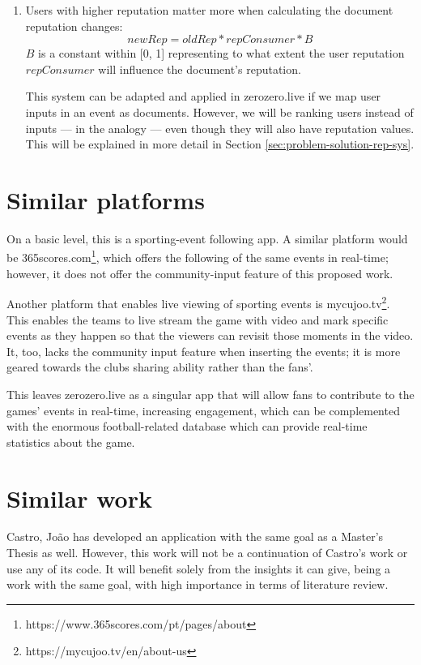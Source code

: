 \begin{enumerate}
    \item Users with higher reputation matter more when calculating the document reputation changes:
    \begin{equation}
        newRep = oldRep * repConsumer * B
    \end{equation}
    $B$ is a constant within [0, 1] representing to what extent the user reputation $repConsumer$ will influence the document's reputation.

    This system can be adapted and applied in zerozero.live if we map user inputs in an event as documents. However, we will be ranking users instead of inputs ---  in the analogy --- even though they will also have reputation values. This will be explained in more detail in Section \ref{sec:problem-solution-rep-sys}.
    
\end{enumerate} 

\section{Similar platforms}

On a basic level, this is a sporting-event following app. A similar platform would be 365scores.com\footnote{https://www.365scores.com/pt/pages/about}, which offers the following of the same events in real-time; however, it does not offer the community-input feature of this proposed work.

Another platform that enables live viewing of sporting events is mycujoo.tv\footnote{https://mycujoo.tv/en/about-us}. This enables the teams to live stream the game with video and mark specific events as they happen so that the viewers can revisit those moments in the video. It, too, lacks the community input feature when inserting the events; it is more geared towards the clubs sharing ability rather than the fans'. 

This leaves zerozero.live as a singular app that will allow fans to contribute to the games' events in real-time, increasing engagement, which can be complemented with the enormous football-related database which can provide real-time statistics about the game.

\section{Similar work}

Castro, João \cite{PedroSousaCastro2020} has developed an application with the same goal as a Master's Thesis as well. However, this work will not be a continuation of Castro's work or use any of its code. It will benefit solely from the insights it can give, being a work with the same goal, with high importance in terms of literature review.

